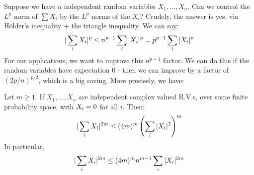 \documentclass[10pt,a4paper]{article}
\let\E\relax
\DeclareMathOperator*{\E}{\raisebox{-0.45em}{\text{\huge $\mathds{E}$}}}
\begin{document}
Suppose we have $n$ independent random variables $X_1, \ldots, X_n$. Can we control the $L^p$ norm of $\sum X_i$ by the $L^p$ norms of the $X_i$? Crudely, the answer is yes, via H\"older's inequality + the triangle inequality. We can say:
\[\E| \sum_{i}X_i|^p \leq n^{p-1} \E \sum_{i} |X_i|^p = p^{p-1} \sum_i \E |X_i|^p\]
For our applications, we want to improve this $n^{p-1}$ factor. We can do this if the random variables have expectation $0$ - then we can improve by a factor of $(2p/n)^{p/2}$, which is a big saving. More precisely, we have:
\begin{lemma}
  Let $m \geq 1$. If $X_1, \ldots, X_n$ are independent complex valued R.V.s, over some finite probability space, with $\E X_i = 0$ for all $i$. Then:
  \[\E |\sum_i X_i|^{2m} \leq (4m)^{m}\E \left(\sum_i |X_i|^2\right)^m\]
  In particular,
  \[\E |\sum_i X_i|^{2m} \leq (4m)^m n^{m-1} \E\sum_i |X_i|^{2m}\]
\end{lemma}
\end{document}
